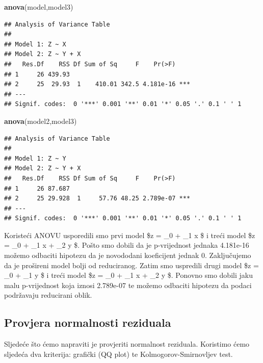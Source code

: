 \documentclass[]{article}
\newenvironment{Shaded}{\begin{snugshade}}{\end{snugshade}}
\newcommand{\KeywordTok}[1]{\textcolor[rgb]{0.13,0.29,0.53}{\textbf{{#1}}}}
\newcommand{\NormalTok}[1]{{#1}}
\begin{document}
\begin{Shaded}
\begin{Highlighting}[]
\KeywordTok{anova}\NormalTok{(model,model3)}
\end{Highlighting}
\end{Shaded}

\begin{verbatim}
## Analysis of Variance Table
## 
## Model 1: Z ~ X
## Model 2: Z ~ Y + X
##   Res.Df    RSS Df Sum of Sq     F    Pr(>F)    
## 1     26 439.93                                 
## 2     25  29.93  1    410.01 342.5 4.181e-16 ***
## ---
## Signif. codes:  0 '***' 0.001 '**' 0.01 '*' 0.05 '.' 0.1 ' ' 1
\end{verbatim}

\begin{Shaded}
\begin{Highlighting}[]
\KeywordTok{anova}\NormalTok{(model2,model3)}
\end{Highlighting}
\end{Shaded}

\begin{verbatim}
## Analysis of Variance Table
## 
## Model 1: Z ~ Y
## Model 2: Z ~ Y + X
##   Res.Df    RSS Df Sum of Sq     F    Pr(>F)    
## 1     26 87.687                                 
## 2     25 29.928  1     57.76 48.25 2.789e-07 ***
## ---
## Signif. codes:  0 '***' 0.001 '**' 0.01 '*' 0.05 '.' 0.1 ' ' 1
\end{verbatim}

Koristeći ANOVU usporedili smo prvi model \$z = \alpha\_0 + \alpha\_1 x
\$ i treći model \$z = \theta\_0 + \theta\_1 x + \theta\_2 y \$. Pošto
smo dobili da je p-vrijednost jednaka 4.181e-16 možemo odbaciti hipotezu
da je novododani koeficijent jednak 0. Zaključujemo da je prošireni
model bolji od reduciranog. Zatim smo uspredili drugi model \$z =
\beta\_0 + \beta\_1 y \$ i treći model \$z = \theta\_0 + \theta\_1 x +
\theta\_2 y \$. Ponovno smo dobili jaku malu p-vrijednost koja iznosi
2.789e-07 te možemo odbaciti hipotezu da podaci podržavaju reducirani
oblik.

\subsection{Provjera normalnosti
reziduala}\label{provjera-normalnosti-reziduala-2}

Sljedeće što ćemo napraviti je provjeriti normalnost reziduala.
Koristimo ćemo sljedeća dva kriterija: grafički (QQ plot) te
Kolmogorov-Smirnovljev test.
\end{document}
